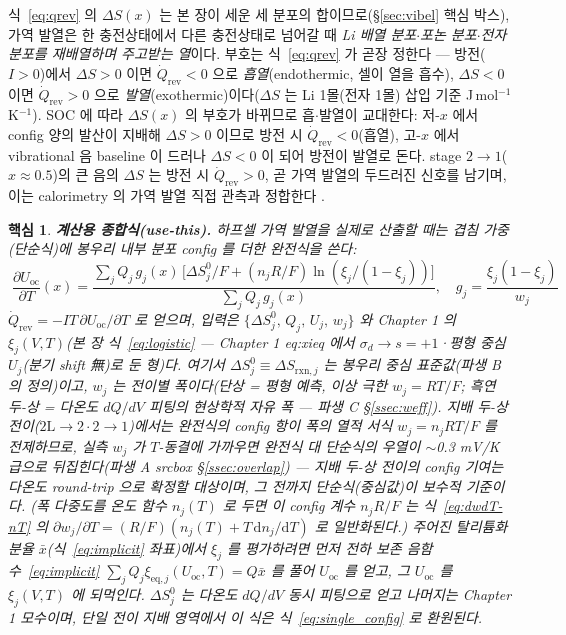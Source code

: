 \documentclass[11pt,a4paper]{article}
\newtheorem*{keybox}{핵심}
\newcommand{\rxn}{\mathrm{rxn}}
\newcommand{\eq}{\mathrm{eq}}
\newcommand{\rev}{\mathrm{rev}}
\newcommand{\oc}{\mathrm{oc}}
\begin{document}
식~\eqref{eq:qrev} 의 $\Delta S(x)$ 는 본 장이 세운 세 분포의 합이므로(\S\ref{sec:vibel} 핵심 박스), 가역
발열은 한 충전상태에서 다른 충전상태로 넘어갈 때 \emph{Li 배열 분포$\cdot$포논 분포$\cdot$전자 분포를 재배열하며
주고받는 열}이다. 부호는 식~\eqref{eq:qrev} 가 곧장 정한다 — 방전($I>0$)에서 $\Delta S>0$ 이면 $\dot Q_\rev<0$ 으로
\emph{흡열}(endothermic, 셀이 열을 흡수), $\Delta S<0$ 이면 $\dot Q_\rev>0$ 으로 \emph{발열}(exothermic)이다($\Delta S$
는 Li 1몰(전자 1몰) 삽입 기준 J\,mol$^{-1}$K$^{-1}$). SOC 에 따라 $\Delta S(x)$ 의 부호가 바뀌므로 흡$\cdot$발열이 교대한다: 저-$x$ 에서
config 양의 발산이 지배해 $\Delta S>0$ 이므로 방전 시 $\dot Q_\rev<0$(흡열), 고-$x$ 에서 vibrational 음
baseline 이 드러나 $\Delta S<0$ 이 되어 방전이 발열로 돈다. stage $2\to1$($x\approx0.5$)의 큰 음의 $\Delta S$
는 방전 시 $\dot Q_\rev>0$, 곧 가역 발열의 두드러진 신호를 남기며, 이는 calorimetry 의 가역 발열 직접 관측과
정합한다 \cite{standardised2024}.

\begin{keybox}
\textbf{계산용 종합식(use-this).} 하프셀 가역 발열을 실제로 산출할 때는 겹침 가중(단순식)에 봉우리 내부 분포
config 를 더한 \emph{완전식}을 쓴다:
\[
\boxed{\;\frac{\partial U_\oc}{\partial T}(x)
=\frac{\sum_j Q_j\,g_j(x)\,\bigl[\Delta S^0_j/F+(n_jR/F)\ln(\xi_j/(1-\xi_j))\bigr]}{\sum_j Q_j\,g_j(x)},\quad
g_j=\frac{\xi_j(1-\xi_j)}{w_j}\;}
\]
$\dot Q_\rev=-IT\,\partial U_\oc/\partial T$ 로 얻으며, \emph{입력}은 $\{\Delta S^0_j,\,Q_j,\,U_j,\,w_j\}$ 와 Chapter 1 의
$\xi_j(V,T)$(본 장 식~\eqref{eq:logistic} — Chapter 1 eq:xieq 에서 $\sigma_d\to s{=}+1$·평형 중심 $U_j$(분기 shift 無)로 둔 형)다. 여기서 $\Delta S^0_j\equiv\Delta S_{\rxn,j}$ 는 봉우리 중심 표준값(파생 B 의
정의)이고, $w_j$ 는 전이별 폭이다(단상 = 평형 예측, 이상 극한 $w_j{=}RT/F$; 흑연 두-상 = 다온도 $dQ/dV$
피팅의 현상학적 자유 폭 — 파생 C \S\ref{ssec:weff}). 지배 두-상 전이($2\mathrm L\!\to\!2\cdot2\!\to\!1$)에서는 완전식의
config 항이 폭의 열적 서식 $w_j=n_jRT/F$ 를 전제하므로, 실측 $w_j$ 가 $T$-동결에 가까우면 완전식 대 단순식의
우열이 $\sim$0.3 mV/K 급으로 뒤집힌다(파생 A srcbox \S\ref{ssec:overlap}) — 지배 두-상 전이의 config 기여는
다온도 round-trip 으로 확정할 대상이며, 그 전까지 단순식(중심값)이 보수적 기준이다. (폭 다중도를 온도 함수 $n_j(T)$ 로
두면 이 config 계수 $n_jR/F$ 는 식~\eqref{eq:dwdT-nT} 의 $\partial w_j/\partial T=(R/F)(n_j(T)+T\,\mathrm{d}n_j/\mathrm{d}T)$ 로 일반화된다.)
주어진 탈리튬화 분율 $\bar x$(식~\eqref{eq:implicit} 좌표)에서 $\xi_j$ 를 평가하려면 먼저 전하 보존
음함수~\eqref{eq:implicit} $\sum_j Q_j\xi_{\eq,j}(U_\oc,T)=Q\bar x$ 를 풀어 $U_\oc$ 를 얻고, 그 $U_\oc$ 를
$\xi_j(V,T)$ 에 되먹인다. $\Delta S^0_j$ 는 다온도 $dQ/dV$ 동시 피팅으로 얻고 나머지는 Chapter 1 모수이며, 단일 전이 지배 영역에서 이 식은
식~\eqref{eq:single_config} 로 환원된다.
\end{keybox}
\end{document}

